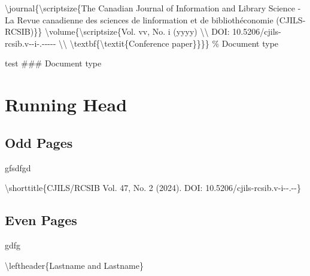 \documentclass[
  letterpaper,
  DIV=11,
  numbers=noendperiod]{scrreprt}
\newenvironment{Shaded}{\begin{snugshade}}{\end{snugshade}}
\newcommand{\NormalTok}[1]{\textcolor[rgb]{0.00,0.23,0.31}{#1}}
\begin{document}
\begin{Shaded}
\begin{Highlighting}[]
\NormalTok{\textbackslash{}journal\{\textbackslash{}scriptsize\{The Canadian Journal of Information and Library Science {-} La Revue canadienne des sciences de l\textquotesingle{}information et de bibliothéconomie (CJILS{-}RCSIB)\}\}}
\NormalTok{\textbackslash{}volume\{\textbackslash{}scriptsize\{Vol. vv, No. i (yyyy) }
\NormalTok{\textbackslash{}\textbackslash{} }
\NormalTok{DOI: 10.5206/cjils{-}rcsib.v{-}{-}i{-}.{-}{-}{-}{-}{-}}
\NormalTok{\textbackslash{}\textbackslash{} }
\NormalTok{\textbackslash{}textbf\{\textbackslash{}textit\{Conference paper\}\}\}\} \% Document type }
\end{Highlighting}
\end{Shaded}

test \#\#\# Document type

\section*{Running Head}\label{running-head}


\subsection*{Odd Pages}\label{odd-pages}

gfsdfgd

\begin{Shaded}
\begin{Highlighting}[]
\NormalTok{\textbackslash{}shorttitle\{CJILS/RCSIB Vol. 47, No. 2 (2024). DOI: 10.5206/cjils{-}rcsib.v{-}i{-}{-}.{-}{-}\}}
\end{Highlighting}
\end{Shaded}

\subsection*{Even Pages}\label{even-pages}

gdfg

\begin{Shaded}
\begin{Highlighting}[]
\NormalTok{\textbackslash{}leftheader\{Lastname and Lastname\}}
\end{Highlighting}
\end{Shaded}
\end{document}
